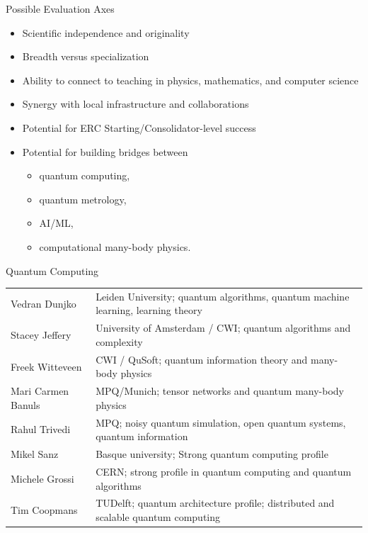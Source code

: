 \documentclass{beamer}
\begin{document}
\begin{frame}{Possible Evaluation Axes}
\begin{itemize}
\item Scientific independence and originality
\item Breadth versus specialization
\item Ability to connect to teaching in physics, mathematics, and computer science
\item Synergy with local infrastructure and collaborations
\item Potential for ERC Starting/Consolidator-level success
\item Potential for building bridges between
\begin{itemize}
\item quantum computing,
\item quantum metrology,
\item AI/ML,
\item computational many-body physics.
\end{itemize}
\end{itemize}
\end{frame}


\begin{frame}{Quantum Computing}
\small
\begin{tabular}{p{} p{}}
Vedran Dunjko & Leiden University; quantum algorithms, quantum machine learning, learning theory \\[0.2cm]
Stacey Jeffery & University of Amsterdam / CWI; quantum algorithms and complexity \\[0.2cm]
Freek Witteveen & CWI / QuSoft; quantum information theory and many-body physics \\[0.2cm]
Mari Carmen Banuls & MPQ/Munich; tensor networks and quantum many-body physics \\[0.2cm]
Rahul Trivedi & MPQ; noisy quantum simulation, open quantum systems, quantum information \\[0.2cm]
Mikel Sanz & Basque university; Strong quantum computing profile \\[0.2cm]
Michele Grossi & CERN; strong profile in quantum computing and quantum algorithms\\[0.2cm]
Tim Coopmans & TUDelft;  quantum architecture profile; distributed and scalable quantum computing \\[0.2cm]
\end{tabular}
\end{frame}
\end{document}
